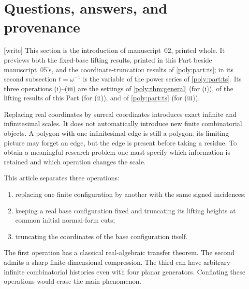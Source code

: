 \documentclass[11pt,a4paper]{article}
\numberwithin{equation}{section}
\theoremstyle{plain}
\newcommand{\wtag}{\textup{[write]}}%
\begin{document}
\section{Questions, answers, and provenance}\label{poly:ts:sec:intro}
\noindent\wtag{} This section is the introduction of manuscript~02, printed
whole. It previews both the fixed-base lifting results, printed in this Part
beside manuscript~05's, and the coordinate-truncation results of
\cref{poly:part:ts}; in its second subsection $t=\omega^{-1}$ is the
variable of the power series of \cref{poly:part:ts}. Its three operations
(i)--(iii) are the settings of \cref{poly:thm:general} (for (i)), of the
lifting results of this Part (for (ii)), and of \cref{poly:part:ts} (for
(iii)).

Replacing real coordinates by surreal coordinates introduces exact infinite
and infinitesimal scales. It does not automatically introduce new finite
combinatorial objects. A polygon with one infinitesimal edge is still a
polygon; its limiting picture may forget an edge, but the edge is present
before taking a residue. To obtain a meaningful research problem one must
specify which information is retained and which operation changes the scale.

This article separates three operations:
\begin{enumerate}[label=(\roman*)]
\item replacing one finite configuration by another with the same signed
incidences;
\item keeping a real base configuration fixed and truncating its lifting
heights at common initial normal-form cuts;
\item truncating the coordinates of the base configuration itself.
\end{enumerate}
The first operation has a classical real-algebraic transfer theorem. The
second admits a sharp finite-dimensional compression. The third can have
arbitrary infinite combinatorial histories even with four planar generators.
Conflating these operations would erase the main phenomenon.
\end{document}
